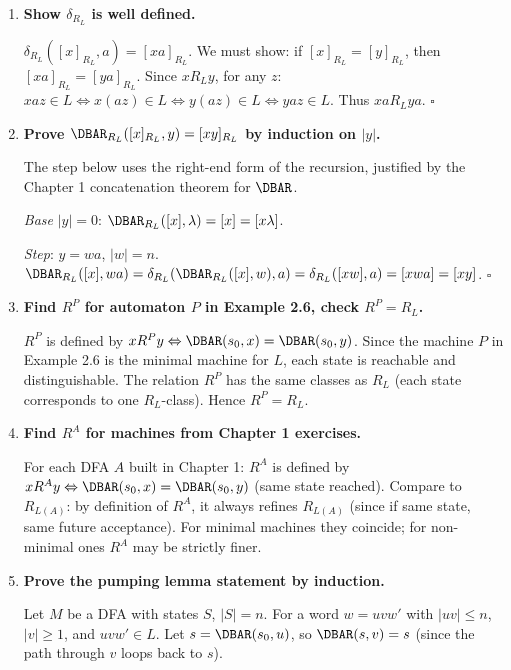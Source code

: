 \begin{enumerate}[{2.}1.]
\item \textbf{Show $\delta_{R_L}$ is well defined.}

$\delta_{R_L}([x]_{R_L}, a) = [xa]_{R_L}$. We must show: if $[x]_{R_L}=[y]_{R_L}$, then $[xa]_{R_L}=[ya]_{R_L}$. Since $x R_L y$, for any $z$: $xaz\in L\Leftrightarrow x(az)\in L\Leftrightarrow y(az)\in L\Leftrightarrow yaz\in L$. Thus $xa R_L ya$. $\square$

\item \textbf{Prove $\DBAR_{R_L}([x]_{R_L},y)=[xy]_{R_L}$ by induction on $|y|$.}

The step below uses the right-end form of the recursion, justified by the
Chapter 1 concatenation theorem for $\DBAR$.

\textit{Base} $|y|=0$: $\DBAR_{R_L}([x],\lambda)=[x]=[x\lambda]$. \checkmark

\textit{Step}: $y=wa$, $|w|=n$. $\DBAR_{R_L}([x],wa)=\delta_{R_L}(\DBAR_{R_L}([x],w),a)=\delta_{R_L}([xw],a)=[xwa]=[xy]$. $\square$

\item \textbf{Find $R^P$ for automaton $P$ in Example 2.6, check $R^P=R_L$.}

$R^P$ is defined by $x R^P y\Leftrightarrow\DBAR(s_0,x)=\DBAR(s_0,y)$. Since the machine $P$ in Example 2.6 is the minimal machine for $L$, each state is reachable and distinguishable. The relation $R^P$ has the same classes as $R_L$ (each state corresponds to one $R_L$-class). Hence $R^P=R_L$.

\item \textbf{Find $R^A$ for machines from Chapter 1 exercises.}

For each DFA $A$ built in Chapter 1: $R^A$ is defined by $x R^A y\Leftrightarrow\DBAR(s_0,x)=\DBAR(s_0,y)$ (same state reached). Compare to $R_{L(A)}$: by definition of $R^A$, it always refines $R_{L(A)}$ (since if same state, same future acceptance). For minimal machines they coincide; for non-minimal ones $R^A$ may be strictly finer.

\item \textbf{Prove the pumping lemma statement by induction.}

Let $M$ be a DFA with states $S$, $|S|=n$. For a word $w=uvw'$ with $|uv|\leq n$, $|v|\geq 1$, and $uvw'\in L$. Let $s=\DBAR(s_0,u)$, so $\DBAR(s,v)=s$ (since the path through $v$ loops back to $s$).


\end{enumerate}
